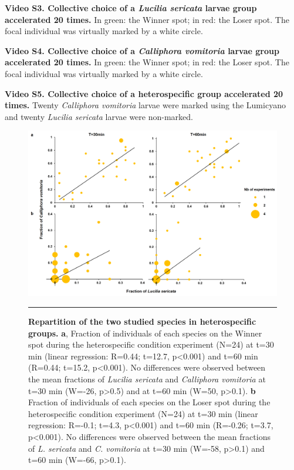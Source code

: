 \textbf{Video S3. Collective choice of a \textit{Lucilia sericata} larvae group accelerated 20 times.} In green: the Winner spot; in red: the Loser spot. The focal individual was virtually marked by a white circle.

\textbf{Video S4. Collective choice of a \textit{Calliphora vomitoria} larvae group accelerated 20 times.} In green: the Winner spot; in red: the Loser spot. The focal individual was virtually marked by a white circle.

\textbf{Video S5. Collective choice of a heterospecific group accelerated 20 times.} Twenty \textit{Calliphora vomitoria} larvae were marked using the Lumicyano and twenty \textit{Lucilia sericata} larvae were non-marked.
\\

\begin{figure}[h]
\centering
		\includegraphics[width=1 \textwidth]{Figures/speciesvsspecies.png}
		\rule{35em}{0.5pt}
		\caption[Species]{\textbf{Repartition of the two studied species in heterospecific groups.} \textbf{a}, Fraction of individuals of each species on the Winner spot during the heterospecific condition experiment (N=24) at t=30 min (linear regression: R=0.44; t=12.7, p<0.001) and t=60 min (R=0.44; t=15.2, p<0.001). No differences were observed between the mean fractions of \textit{Lucilia sericata} and \textit{Calliphora vomitoria} at t=30 min (W=-26, p>0.5) and at t=60 min (W=50, p>0.1). \textbf{b} Fraction of individuals of each species on the Loser spot during the heterospecific condition experiment (N=24) at t=30 min (linear regression: R=-0.1; t=4.3, p<0.001) and t=60 min (R=-0.26; t=3.7, p<0.001). No differences were observed between the mean fractions of \textit{L. sericata} and \textit{C. vomitoria} at t=30 min (W=-58, p>0.1) and t=60 min (W=-66, p>0.1).}
	\label{fig:species}
\end{figure}    

